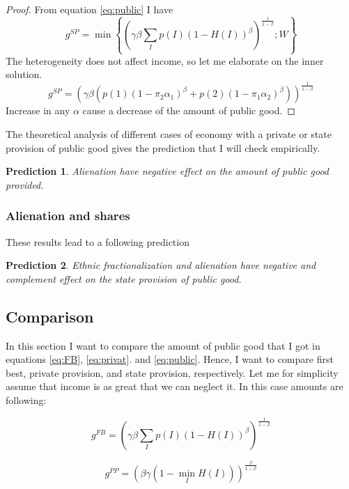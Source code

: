 \documentclass[letterpaper,11pt]{article}
\newtheorem{prediction}{Prediction}
\begin{document}
\begin{proof}
    From equation \ref{eq:public} I have 
    \[ g^{SP} = \min \left\{ \left( \gamma  \beta\sum_{I} p(I) (1 - H(I))^\beta \right)^\frac{1}{1 - \beta}; W \right\} \]
    The heterogeneity does not affect income, so let me elaborate on the inner solution.
    \[ g^{SP} = \left( \gamma  \beta \left( p(1) (1 - \pi_2\alpha_1)^\beta + p(2) (1 - \pi_1\alpha_2)^\beta  \right) \right)^\frac{1}{1 - \beta} \]
    Increase in any $\alpha$ cause a decrease of the amount of public good.
\end{proof}

The theoretical analysis of different cases of economy with a private or state provision of public good gives the prediction that I will check empirically.

\begin{prediction}
    Alienation have negative effect on the amount of public good provided.
\end{prediction}


\subsubsection{ Alienation and shares}

These results lead to a following prediction

\begin{prediction}
    Ethnic fractionalization and alienation have negative and complement effect on the state provision of public good.
\end{prediction}

\subsection{Comparison}

In this section I want to compare the amount of public good that I got in equations \ref{eq:FB}, \ref{eq:privat}. and \ref{eq:public}. Hence, I want to compare first best, private provision, and state provision, respectively. Let me for simplicity assume that income is as great that we can neglect it. In this case amounts are following:

\[  g^{FB} = \left( \gamma\beta \sum_{I} p(I) (1-H(I))^{\beta} \right) ^\frac{1}{1 - \beta }  \]

\[ g^{PP} =  (\beta\gamma  ( 1 - \min_{I} H(I)))^\frac{\beta}{1 -\beta} \]
\end{document}
